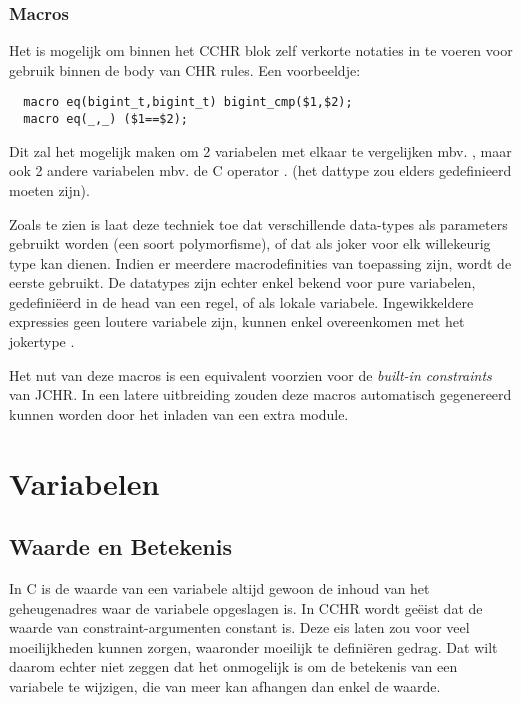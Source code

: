\subsubsection{Macros}

Het is mogelijk om binnen het CCHR blok zelf verkorte notaties in te voeren voor gebruik binnen de body van CHR rules. Een voorbeeldje: \begin{Verbatim}
  macro eq(bigint_t,bigint_t) bigint_cmp($1,$2);
  macro eq(_,_) ($1==$2);
\end{Verbatim}

Dit zal het mogelijk maken om 2  variabelen met elkaar te vergelijken mbv. , maar ook 2 andere variabelen mbv. de C operator \code{==}. (het dattype  zou elders gedefinieerd moeten zijn).

Zoals te zien is laat deze techniek toe dat verschillende data-types als parameters gebruikt worden (een soort polymorfisme), of dat \code{\_} als joker voor elk willekeurig type kan dienen. Indien er meerdere macrodefinities van toepassing zijn, wordt de eerste gebruikt. De datatypes zijn echter enkel bekend voor pure variabelen, gedefini\"eerd in de head van een regel, of als lokale variabele. Ingewikkeldere expressies geen loutere variabele zijn, kunnen enkel overeenkomen met het jokertype \code{\_}.

Het nut van deze macros is een equivalent voorzien voor de {\em built-in constraints} van JCHR. In een latere uitbreiding zouden deze macros automatisch gegenereerd kunnen worden door het inladen van een extra module.

\section{Variabelen} \label{sec:taal-var}

\subsection{Waarde en Betekenis}

In C is de waarde van een variabele altijd gewoon de inhoud van het geheugenadres waar de variabele opgeslagen is. In CCHR wordt ge\"eist dat de waarde van constraint-argumenten constant is. Deze eis laten zou voor veel moeilijkheden kunnen zorgen, waaronder moeilijk te defini\"eren gedrag. Dat wilt daarom echter niet zeggen dat het onmogelijk is om de betekenis van een variabele te wijzigen, die van meer kan afhangen dan enkel de waarde. 

